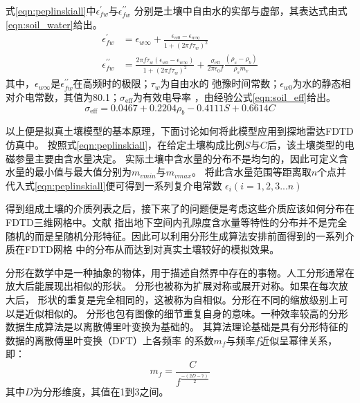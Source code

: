 式\ref{eqn:peplinskiall}中$\epsilon_{f w}^{\prime}$与$\epsilon_{f w}^{\prime \prime}$
分别是土壤中自由水的实部与虚部，其表达式由式\ref{eqn:soil_water}给出。
\begin{equation} 
	\label{eqn:soil_water}
	\begin{aligned}
		\epsilon_{f w}^{\prime}&=\epsilon_{w \infty}+\frac{\epsilon_{w 0}-\epsilon_{w \infty}}{1+\left(2 \pi f \tau_{w}\right)^{2}} \\
		\epsilon_{f w}^{\prime \prime}&=\frac{2 \pi f \tau_{w}\left(\epsilon_{w 0}-\epsilon_{w \infty}\right)}{1+\left(2 \pi f \tau_{w}\right)^{2}}+\frac{\sigma_{\mathrm{eff}}}{2 \pi \epsilon_{0} f} \frac{\left(\rho_{s}-\rho_{b}\right)}{\rho_{s} m_{v}}
	\end{aligned}
\end{equation}
其中，$\epsilon_{w \infty}$是$\epsilon_{f w}^{\prime \prime}$在高频时的极限；$\tau_{w}$为自由水的
弛豫时间常数；$\epsilon_{w 0}$为水的静态相对介电常数，其值为80.1；$\sigma_{\mathrm{eff}}$为有效电导率
，由经验公式\ref{eqn:soil_eff}给出。
\begin{equation}
	\label{eqn:soil_eff}
\sigma_{\mathrm{eff}}=0.0467+0.2204 \rho_{b}-0.4111 S+0.6614 C
\end{equation}

以上便是拟真土壤模型的基本原理，下面讨论如何将此模型应用到探地雷达FDTD仿真中。
按照式\ref{eqn:peplinskiall}，在给定土壤构成比例$S$与$C$后，该土壤类型的电磁参量主要由含水量决定。
实际土壤中含水量的分布不是均匀的，因此可定义含水量的最小值与最大值分别为$m_{vmin}$与$m_{vmax}$。
将此含水量范围等距离取$n$个点并代入式\ref{eqn:peplinskiall}便可得到一系列复介电常数
$\epsilon_i(i=1,2,3...n)$ 

得到组成土壤的介质列表之后，接下来了的问题便是考虑这些介质应该如何分布在FDTD三维网格中。文献
\cite{turcotte1997fractals}
指出地下空间内孔隙度含水量等特性的分布并不是完全随机的而是呈随机分形特征。因此可以利用分形生成算法安排前面得到的一系列介质在FDTD网格
中的分布从而达到对真实土壤较好的模拟效果。

分形在数学中是一种抽象的物体，用于描述自然界中存在的事物。人工分形通常在放大后能展现出相似的形状。 
分形也被称为扩展对称或展开对称。如果在每次放大后，
形状的重复是完全相同的，这被称为自相似。分形在不同的缩放级别上可以是近似相似的。 
分形也包有图像的细节重复自身的意味。一种效率较高的分形数据生成算法是以离散傅里叶变换为基础的。
其算法理论基础是具有分形特征的数据的离散傅里叶变换（DFT）上各频率
的系数$m_f$与频率$f$近似呈幂律关系，即：
\begin{equation}
m_f = \frac{C}{f^{\frac{-(2 D-7)}{2}}}
\end{equation}
其中$D$为分形维度，其值在1到3之间。

